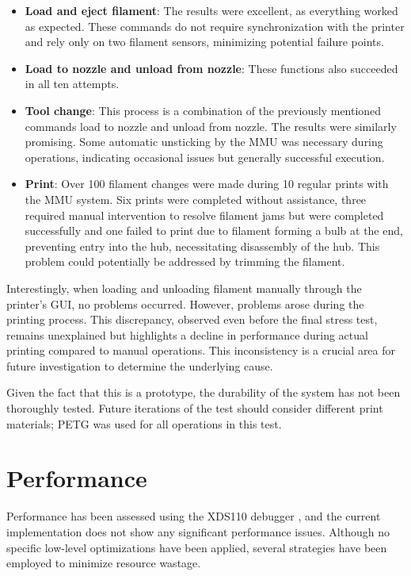 \begin{itemize}
    \item \textbf{Load and eject filament}: The results were excellent, as everything worked as expected. These commands do not require synchronization with the printer and rely only on two filament sensors, minimizing potential failure points.
    \item \textbf{Load to nozzle and unload from nozzle}: These functions also succeeded in all ten attempts.
    \item \textbf{Tool change}: This process is a combination of the previously mentioned commands load to nozzle and unload from nozzle. The results were similarly promising. Some automatic unsticking by the MMU was necessary during operations, indicating occasional issues but generally successful execution.
    \item \textbf{Print}: Over 100 filament changes were made during 10 regular prints with the MMU system. Six prints were completed without assistance, three required manual intervention to resolve filament jams but were completed successfully and one failed to print due to filament forming a bulb at the end, preventing entry into the hub, necessitating disassembly of the hub. This problem could potentially be addressed by trimming the filament.
\end{itemize}


Interestingly, when loading and unloading filament manually through the printer's GUI, no problems occurred. However, problems arose during the printing process. This discrepancy, observed even before the final stress test, remains unexplained but highlights a decline in performance during actual printing compared to manual operations. This inconsistency is a crucial area for future investigation to determine the underlying cause.

Given the fact that this is a prototype, the durability of the system has not been thoroughly tested. Future iterations of the test should consider different print materials; PETG \cite{petg} was used for all operations in this test.

\section{Performance}

Performance has been assessed using the XDS110 debugger \cite{debugger}, and the current implementation does not show any significant performance issues. Although no specific low-level optimizations have been applied, several strategies have been employed to minimize resource wastage.

